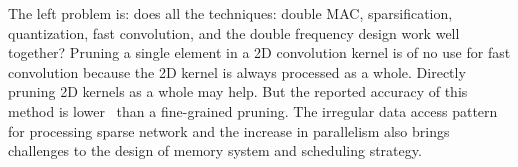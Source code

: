 The left problem is: does all the techniques: double MAC, sparsification, quantization, fast convolution, and the double frequency design work well together? Pruning a single element in a 2D convolution kernel is of no use for fast convolution because the 2D kernel is always processed as a whole. Directly pruning 2D kernels as a whole may help. But the reported accuracy of this method is lower~\cite{Mao2017Exploring} than a fine-grained pruning. The irregular data access pattern for processing sparse network and the increase in parallelism also brings challenges to the design of memory system and scheduling strategy.

